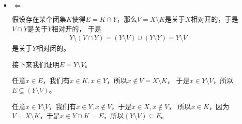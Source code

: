 \documentclass{article}
\begin{document}
\begin{itemize}
  \item $\Leftarrow$

        假设存在某个闭集$K$使得$E = K \cap Y$，那么$V = X \setminus K$是关于$X$相对开的，于是$V \cap Y$是关于$Y$相对开的，
        于是
        \begin{align*}
          Y \setminus (V \cap Y) = (Y \setminus V) \cup (Y \setminus Y) = Y \setminus V 
        \end{align*}
        是关于$Y$相对闭的。

        接下来我们证明$E = Y \setminus V$。

        任意$x \in E$，我们有$x \in K, x \in Y$，所以$x \notin V = X \setminus K$，
        于是$x \in Y \setminus V$，所以$E \subseteq (Y \setminus V)$。

        任意$x \in Y \setminus V$，我们有$x \in Y, x \notin V$，于是$x \in X, x \notin V$，
        所以$x \in K$，因为$V = X \setminus K$，于是$x \in Y \cap K = E$，所以$(Y \setminus V) \subseteq E$。


\end{itemize}
\end{document}
